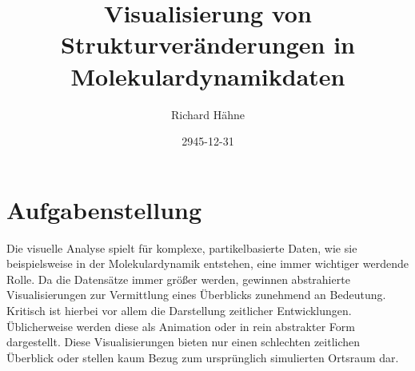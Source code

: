 







\subject{Arbeitsname Bachelorarbeit}
\title{Visualisierung von Strukturveränderungen in Molekulardynamikdaten}

\author{%
	Richard Hähne
}

\date{2945-12-31}


\maketitle

\confirmation \tableofcontents %

\printacronyms[style=acrotabu] \printsymbols[style=symblongtabu]


\chapter{Aufgabenstellung}

Die visuelle Analyse spielt für komplexe, partikelbasierte Daten, wie sie beispielsweise in der Molekulardynamik entstehen, eine immer wichtiger werdende Rolle. Da die Datensätze immer größer werden, gewinnen abstrahierte Visualisierungen zur Vermittlung eines Überblicks zunehmend an Bedeutung. Kritisch ist hierbei vor allem die Darstellung zeitlicher Entwicklungen. Üblicherweise werden diese als Animation oder in rein abstrakter Form dargestellt. Diese Visualisierungen bieten nur einen schlechten zeitlichen Überblick oder stellen kaum Bezug zum ursprünglich simulierten Ortsraum dar.

